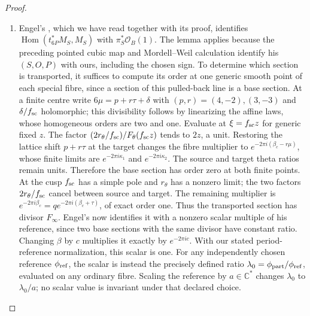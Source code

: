 \begin{proof}
\begin{enumerate}[label=\arabic*.,leftmargin=*]
\item Engel's \cite[Lemma 2.1]{Engel2026}, which we have read together with its proof, identifies $\operatorname{Hom}(t_{6P}^*M_S,M_S)$ with $\pi_S^*\mathcal O_B(1)$. The lemma applies because the preceding pointed cubic map and Mordell--Weil calculation identify his $(S,O,P)$ with ours, including the chosen sign. To determine which section is transported, it suffices to compute its order at one generic smooth point of each special fibre, since a section of this pulled-back line is a base section. At a finite centre write $6\mu=p+r\tau+\delta$ with $(p,r)=(4,-2),(3,-3)$ and $\delta/f_{\rm sc}$ holomorphic; this divisibility follows by linearizing the affine laws, whose homogeneous orders are two and one. Evaluate at $\xi=f_{\rm sc}z$ for generic fixed $z$. The factor $(2r_\theta/f_{\rm sc})/F_\theta(f_{\rm sc}z)$ tends to $2z$, a unit. Restoring the lattice shift $p+r\tau$ at the target changes the fibre multiplier to $e^{-2\pi i(\beta_c-r\mu)}$, whose finite limits are $e^{-2\pi i\kappa_1}$ and $e^{-2\pi i\kappa_2}$. The source and target theta ratios remain units. Therefore the base section has order zero at both finite points. At the cusp $f_{\rm sc}$ has a simple pole and $r_\theta$ has a nonzero limit; the two factors $2r_\theta/f_{\rm sc}$ cancel between source and target. The remaining multiplier is
$e^{-2\pi i\beta_c}=q e^{-2\pi i(\beta_c+\tau)}$, of exact order one. Thus the transported section has divisor $F_\infty$. Engel's \cite[Corollary 2.2]{Engel2026} now identifies it with a nonzero scalar multiple of his reference, since two base sections with the same divisor have constant ratio. Changing $\beta$ by $c$ multiplies it exactly by $e^{-2\pi ic}$. With our stated period-reference normalization, this scalar is one. For any independently chosen reference $\phi_{\rm ref}$, the scalar is instead the precisely defined ratio $\lambda_0=\phi_{\rm part}/\phi_{\rm ref}$, evaluated on any ordinary fibre. Scaling the reference by $a\in\mathbb C^*$ changes $\lambda_0$ to $\lambda_0/a$; no scalar value is invariant under that declared choice.
\end{enumerate}
\end{proof}